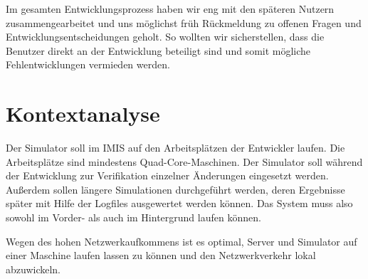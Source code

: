 Im gesamten Entwicklungsprozess haben wir eng mit den späteren Nutzern zusammengearbeitet und uns möglichst früh Rückmeldung zu offenen Fragen und Entwicklungsentscheidungen geholt. So wollten wir sicherstellen, dass die Benutzer direkt an der Entwicklung beteiligt sind und somit mögliche Fehlentwicklungen vermieden werden.


\section{Kontextanalyse}\label{sec:context_ana}
Der Simulator soll im IMIS auf den Arbeitsplätzen der Entwickler laufen. Die Arbeitsplätze sind mindestens Quad-Core-Maschinen. Der Simulator soll während der Entwicklung zur Verifikation einzelner Änderungen eingesetzt werden. Außerdem sollen längere Simulationen durchgeführt werden, deren Ergebnisse später mit Hilfe der Logfiles ausgewertet werden können. Das System muss also sowohl im Vorder- als auch im Hintergrund laufen können.

Wegen des hohen Netzwerkaufkommens ist es optimal, Server und Simulator auf einer Maschine laufen lassen zu können und den Netzwerkverkehr lokal abzuwickeln.
